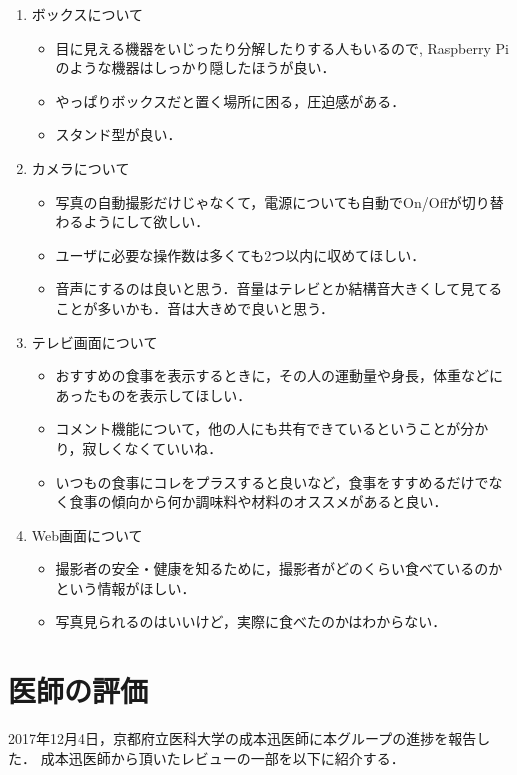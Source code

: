 \documentclass[../report]{subfiles}
\begin{document}
\begin{enumerate}
    \item[] ボックスについて
    \begin{itemize}
        \item 目に見える機器をいじったり分解したりする人もいるので, Raspberry Piのような機器はしっかり隠したほうが良い．
        \item やっぱりボックスだと置く場所に困る，圧迫感がある．
        \item スタンド型が良い．
    \end{itemize}

    \item[] カメラについて
    \begin{itemize}
        \item 写真の自動撮影だけじゃなくて，電源についても自動でOn/Offが切り替わるようにして欲しい．
        \item ユーザに必要な操作数は多くても2つ以内に収めてほしい．
        \item 音声にするのは良いと思う．音量はテレビとか結構音大きくして見てることが多いかも．音は大きめで良いと思う．
    \end{itemize}

    \item[] テレビ画面について
    \begin{itemize}
        \item おすすめの食事を表示するときに，その人の運動量や身長，体重などにあったものを表示してほしい．
        \item コメント機能について，他の人にも共有できているということが分かり，寂しくなくていいね．
        \item いつもの食事にコレをプラスすると良いなど，食事をすすめるだけでなく食事の傾向から何か調味料や材料のオススメがあると良い．
    \end{itemize}

    \item[] Web画面について
    \begin{itemize}
        \item 撮影者の安全・健康を知るために，撮影者がどのくらい食べているのかという情報がほしい．
        \item 写真見られるのはいいけど，実際に食べたのかはわからない．
    \end{itemize}
\end{enumerate}

\section{医師の評価}
2017年12月4日，京都府立医科大学の成本迅医師に本グループの進捗を報告した．
成本迅医師から頂いたレビューの一部を以下に紹介する．
\end{document}
